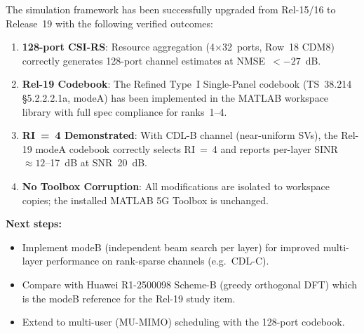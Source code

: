 \documentclass[11pt,a4paper]{article}
\begin{document}
The simulation framework has been successfully upgraded from Rel-15/16 to
Release~19 with the following verified outcomes:

\begin{enumerate}
  \item \textbf{128-port CSI-RS}: Resource aggregation (4$\times$32~ports,
        Row~18 CDM8) correctly generates 128-port channel estimates at
        NMSE~$< -27$~dB.

  \item \textbf{Rel-19 Codebook}: The Refined Type~I Single-Panel codebook
        (TS~38.214 \S5.2.2.2.1a, modeA) has been implemented in the MATLAB
        workspace library with full spec compliance for ranks~1--4.

  \item \textbf{RI~=~4 Demonstrated}: With CDL-B channel (near-uniform SVs),
        the Rel-19 modeA codebook correctly selects RI~=~4 and reports
        per-layer SINR $\approx 12$--17~dB at SNR~20~dB.

  \item \textbf{No Toolbox Corruption}: All modifications are isolated to
        workspace copies; the installed MATLAB 5G Toolbox is unchanged.
\end{enumerate}

\noindent\textbf{Next steps:}
\begin{itemize}
  \item Implement modeB (independent beam search per layer) for improved
        multi-layer performance on rank-sparse channels (e.g.\ CDL-C).
  \item Compare with Huawei R1-2500098 Scheme-B (greedy orthogonal DFT)
        which is the modeB reference for the Rel-19 study item.
  \item Extend to multi-user (MU-MIMO) scheduling with the 128-port codebook.
\end{itemize}
\end{document}
